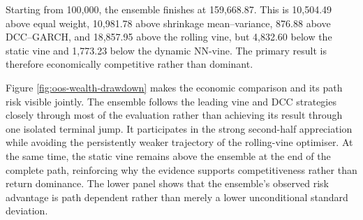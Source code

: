 \begin{table}[H]
\centering
\caption{Frozen Primary Performance on 22 Complete Locked Periods}
\label{tab:outofsample}
\caption*{\footnotesize Notes: CAGR, volatility, and CRRA certainty-equivalent return are annualised. Turnover is frozen mean monthly full-$L_1$ target-to-target turnover. Bold denotes the best observed value, with lower values preferred for volatility, drawdown, and turnover. Rankings are descriptive.}
\end{table}

Starting from 100,000, the ensemble finishes at 159,668.87. This is 10,504.49 above equal weight, 10,981.78 above shrinkage mean--variance, 876.88 above DCC--GARCH, and 18,857.95 above the rolling vine, but 4,832.60 below the static vine and 1,773.23 below the dynamic NN-vine. The primary result is therefore economically competitive rather than dominant.

Figure \ref{fig:oos-wealth-drawdown} makes the economic comparison and its path risk visible jointly. The ensemble follows the leading vine and DCC strategies closely through most of the evaluation rather than achieving its result through one isolated terminal jump. It participates in the strong second-half appreciation while avoiding the persistently weaker trajectory of the rolling-vine optimiser. At the same time, the static vine remains above the ensemble at the end of the complete path, reinforcing why the evidence supports competitiveness rather than return dominance. The lower panel shows that the ensemble's observed risk advantage is path dependent rather than merely a lower unconditional standard deviation.

